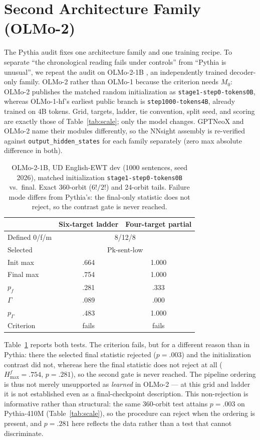\documentclass[11pt]{article}
\begin{document}
\section{Second Architecture Family (OLMo-2)}
\label{app:olmo}
The Pythia audit fixes one architecture family and one training recipe. To separate ``the chronological reading fails under controls'' from ``Pythia is unusual'', we repeat the audit on OLMo-2-1B \citep{olmo2024olmo2}, an independently trained decoder-only family. OLMo-2 rather than OLMo-1 because the criterion needs $M_0$: OLMo-2 publishes the matched random initialization as \texttt{stage1-step0-tokens0B}, whereas OLMo-1-hf's earliest public branch is \texttt{step1000-tokens4B}, already trained on 4B tokens. Grid, targets, ladder, tie convention, split seed, and scoring are exactly those of Table~\ref{tab:scale}; only the model changes. GPTNeoX and OLMo-2 name their modules differently, so the NNsight assembly is re-verified against \texttt{output\_hidden\_states} for each family separately (zero max absolute difference in both).

\begin{table}[t]
\centering\small
\begin{tabular}{lcc}
\toprule
 & Six-target ladder & Four-target partial \\
\midrule
Defined 0/f/m & \multicolumn{2}{c}{8/12/8} \\
Selected      & \multicolumn{2}{c}{Pk-sent-low} \\
Init max      & .664 & 1.000 \\
Final max     & .754 & 1.000 \\
$p_f$         & .281 & .333 \\
$\Gamma$      & .089 & .000 \\
$p_\Gamma$    & .483 & 1.000 \\
Criterion     & fails & fails \\
\bottomrule
\end{tabular}
\caption{OLMo-2-1B, UD English-EWT dev (1000 sentences, seed 2026), matched initialization \texttt{stage1-step0-tokens0B} vs.\ final. Exact 360-orbit ($6!/2!$) and 24-orbit tails. Failure mode differs from Pythia's: the final-only statistic does not reject, so the contrast gate is never reached.}
\label{tab:olmo}
\end{table}

Table~\ref{tab:olmo} reports both tests. The criterion fails, but for a different reason than in Pythia: there the selected final statistic rejected ($p=.003$) and the initialization contrast did not, whereas here the final statistic does not reject at all ($H^f_{\max}=.754$, $p=.281$), so the second gate is never reached. The pipeline ordering is thus not merely unsupported as \emph{learned} in OLMo-2 --- at this grid and ladder it is not established even as a final-checkpoint description. This non-rejection is informative rather than structural: the same 360-orbit test attains $p=.003$ on Pythia-410M (Table~\ref{tab:scale}), so the procedure can reject when the ordering is present, and $p=.281$ here reflects the data rather than a test that cannot discriminate.
\end{document}
